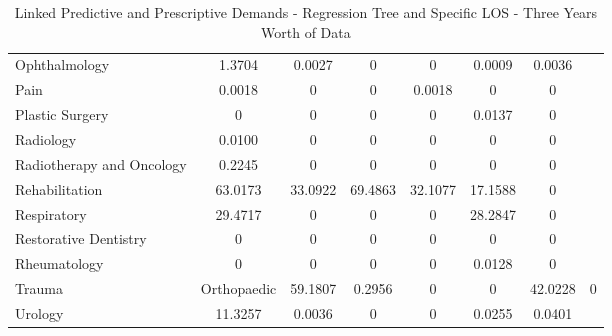 \documentclass[thesis.tex]{subfiles}
\begin{document}
\begin{table}[h!]
{\begin{tabular}{lccccccc}
Ophthalmology&1.3704&	0.0027&	0&	0&	0.0009&	0.0036\\
Pain&0.0018&	0&	0&	0.0018&	0&	0\\
Plastic Surgery&0&	0&	0&	0&	0.0137&	0\\
Radiology&0.0100&	0&	0&	0&	0&	0\\
Radiotherapy and Oncology&0.2245&	0&	0&	0&	0&	0\\
 Rehabilitation&63.0173&	33.0922&	69.4863&	32.1077&	17.1588&	0\\
Respiratory &29.4717&	0&	0&	0&	28.2847&	0\\
Restorative Dentistry&0&	0&	0&	0&	0&	0\\
Rheumatology&0&	0&	0&	0&	0.0128&	0\\
Trauma & Orthopaedic&59.1807&	0.2956&	0&	0&	42.0228&	0\\
Urology&11.3257&	0.0036&	0&	0&	0.0255&	0.0401\\\bottomrule
    \end{tabular}}
    \caption{Linked Predictive and Prescriptive Demands - Regression Tree and Specific LOS - Three Years Worth of Data}
    \label{apptab:LinkedDemands4}
\end{table}
\end{document}
